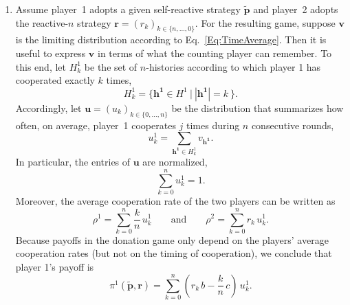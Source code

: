 \documentclass[11pt]{article}
\theoremstyle{plainCl1}
\theoremstyle{plainCl2}
\begin{document}
\begin{enumerate}
\item Assume player~1 adopts a given self-reactive strategy $\mathbf{\tilde p}$ and player~2 adopts the reactive-$n$ strategy $\mathbf{r}\!=\!(r_k)_{k\in\{n,\ldots,0\}}$. For the resulting game, suppose $\mathbf{v}$ is the limiting distribution according to Eq.~\eqref{Eq:TimeAverage}. 
Then it is useful to express $\mathbf{v}$ in terms of what the counting player can remember. To this end, let $H^1_k$ be the set of $n$-histories according to which player 1 has cooperated exactly $k$ times,
\begin{equation}
H^1_k = \Big\{ \mathbf{h^1} \!\in\! H^1~\Big|~|\mathbf{h^1}|\!=\!k~\Big\}.
\end{equation}
Accordingly, let $\mathbf{u}\!=\!(u_k)_{k\in\{0,\ldots,n\}}$ be the distribution that summarizes how often, on average, player~1 cooperates $j$ times during $n$ consecutive rounds, 
\begin{equation}
u^1_k = \sum_{\mathbf{h^1} \in H^1_k} v_\mathbf{h^1}.
\end{equation}
In particular, the entries of $\mathbf{u}$ are normalized, 
\begin{equation} \label{Eq:uNormalized}
\sum_{k=0}^n u^1_k = 1. 
\end{equation}
Moreover, the average cooperation rate of the two players can be written as
\begin{equation}
\rho^1 = \sum_{k=0}^n \frac{k}{n}\,u^1_k \qquad \text{and} \qquad \rho^2 = \sum_{k=0}^n r_k\,u^1_k.
\end{equation}
Because payoffs in the donation game only depend on the players' average cooperation rates (but not on the timing of cooperation), we conclude that player 1's payoff is
\begin{equation} \label{Eq:CountingDeviationPayoff}
\pi^1(\mathbf{\tilde p},\mathbf{r}) = \sum_{k=0}^n  (r_k\,b - \frac{k}{n}\,c) \,u^1_k.
\end{equation}


\end{enumerate}
\end{document}
